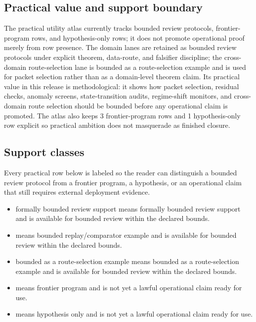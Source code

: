 \subsection{Practical value and support boundary}
The practical utility atlas currently tracks bounded review protocols, frontier-program rows, and hypothesis-only rows; it does not promote operational proof merely from row presence.
The domain lanes are retained as bounded review protocols under explicit theorem, data-route, and falsifier discipline; the cross-domain route-selection lane is bounded as a route-selection example and is used for packet selection rather than as a domain-level theorem claim.
Its practical value in this release is methodological: it shows how packet selection, residual checks, anomaly screens, state-transition audits, regime-shift monitors, and cross-domain route selection should be bounded before any operational claim is promoted.
The atlas also keeps 3 frontier-program rows and 1 hypothesis-only row explicit so practical ambition does not masquerade as finished closure.

\subsection{Support classes}
Every practical row below is labeled so the reader can distinguish a bounded review protocol from a frontier program, a hypothesis, or an operational claim that still requires external deployment evidence.
\begin{itemize}[leftmargin=1.6em,nosep]
\item formally bounded review support means formally bounded review support and is available for bounded review within the declared bounds.
\item {} means bounded replay/comparator example and is available for bounded review within the declared bounds.
\item bounded as a route-selection example means bounded as a route-selection example and is available for bounded review within the declared bounds.
\item {} means frontier program and is not yet a lawful operational claim ready for use.
\item {} means hypothesis only and is not yet a lawful operational claim ready for use.
\end{itemize}

